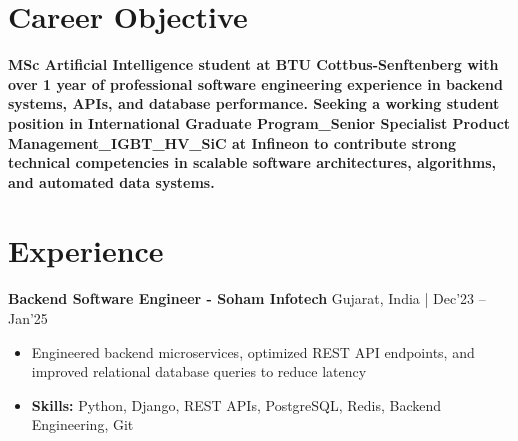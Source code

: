 \documentclass[a4paper,11pt]{article}
\begin{document}
\vspace{-7mm}

\section{\textbf{Career Objective}}
\vspace{1mm}

\textbf{MSc Artificial Intelligence student at BTU Cottbus-Senftenberg with over 1 year of professional software engineering experience in backend systems, APIs, and database performance. Seeking a working student position in International Graduate Program\_Senior Specialist Product Management\_IGBT\_HV\_SiC at Infineon to contribute strong technical competencies in scalable software architectures, algorithms, and automated data systems.}
\section{\textbf{Experience}}


\vspace{1mm}
  \textbf{Backend Software Engineer - Soham Infotech} \hfill Gujarat, India | Dec'23 -- Jan'25
\vspace{-1.5mm} %
\begin{itemize}
  \item Engineered backend microservices, optimized REST API endpoints, and improved relational database queries to reduce latency


\vspace{-2mm}
  \item \textbf{Skills:} Python, Django, REST APIs, PostgreSQL, Redis, Backend Engineering, Git
\end{itemize}
\end{document}
